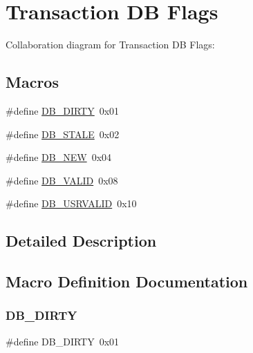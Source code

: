 \hypertarget{group__mt__dbflag}{}\section{Transaction DB Flags}
\label{group__mt__dbflag}
Collaboration diagram for Transaction DB Flags\+:
\subsection*{Macros}
\begin{DoxyCompactItemize}
\item 
\#define \mbox{\hyperlink{group__mt__dbflag_ga787c81e5c1fc66acb6499e91cf0277a5}{D\+B\+\_\+\+D\+I\+R\+TY}}~0x01
\item 
\#define \mbox{\hyperlink{group__mt__dbflag_ga5f4ab5cd9a3f9a427ad7eec85ea7d6bb}{D\+B\+\_\+\+S\+T\+A\+LE}}~0x02
\item 
\#define \mbox{\hyperlink{group__mt__dbflag_gaa34ab4f3219e045f382b2cb9dd4b1fe1}{D\+B\+\_\+\+N\+EW}}~0x04
\item 
\#define \mbox{\hyperlink{group__mt__dbflag_gac774963973e18f60ae646b7295219a8d}{D\+B\+\_\+\+V\+A\+L\+ID}}~0x08
\item 
\#define \mbox{\hyperlink{group__mt__dbflag_gadb138759ab6050eb44273a92882c61eb}{D\+B\+\_\+\+U\+S\+R\+V\+A\+L\+ID}}~0x10
\end{DoxyCompactItemize}


\subsection{Detailed Description}


\subsection{Macro Definition Documentation}
\mbox{\label{group__mt__dbflag_ga787c81e5c1fc66acb6499e91cf0277a5}} 
\subsubsection{\texorpdfstring{D\+B\+\_\+\+D\+I\+R\+TY}{DB\_DIRTY}}
{\footnotesize\ttfamily \#define D\+B\+\_\+\+D\+I\+R\+TY~0x01}

